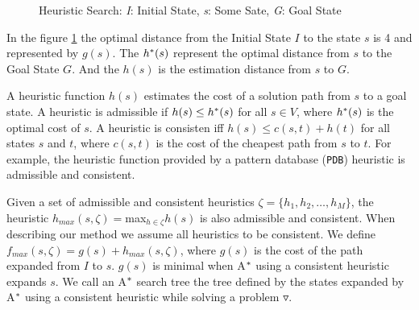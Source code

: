 \documentclass[a4paper,12pt]{article}
\begin{document}
\begin{figure}[htb]
\centering
{}
\caption{Heuristic Search: \textit{I}: Initial State, \textit{s}: Some Sate, \textit{G}: Goal State} \label{fig:searchSpace}
\end{figure}

In the figure \ref{fig:searchSpace} the optimal distance from the Initial State $I$ to  the state $s$ is 4 and represented by $g(s)$. The $h\sp{*}(s)$ represent the optimal distance from $s$ to the Goal State $G$. And the $h(s)$ is the estimation distance from $s$ to $G$.

A heuristic function $h(s)$ estimates the cost of a solution path from $s$ to a goal state. A heuristic is admissible if $h(s) \leq h\sp{*}(s)$ for all $s \in V$, where $h\sp{*}(s)$ is the optimal cost of $s$. A heuristic is consisten iff $h(s) \leq c(s,t) + h(t)$ for all states $s$ and $t$, where $c(s,t)$ is the cost of the cheapest path from $s$ to $t$. For example, the heuristic function provided by a pattern database (\texttt{PDB}) heuristic \citep{culberson1998pattern} is admissible and consistent.

Given a set of admissible and consistent heuristics $\zeta = \{h_{1}, h_{2}, \dots, h_{M}\}$, the heuristic $h_{max}(s,\zeta) = $max$_{h \in \zeta} h(s)$ is also admissible and consistent. When describing our method we assume all heuristics to be consistent. We define $f_{max}(s, \zeta) = g(s) + h_{max}(s, \zeta)$, where $g(s)$ is the cost of the path expanded from $I$ to $s$. $g(s)$ is minimal when A$\sp{*}$ using a consistent heuristic expands $s$. We call an A$\sp{*}$ search tree the tree defined by the states expanded by A$\sp{*}$ using a consistent heuristic while solving a problem $\triangledown$.
\end{document}
